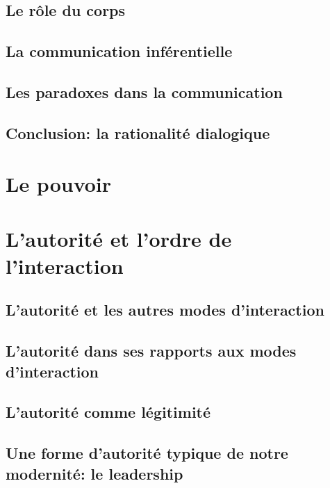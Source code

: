 \documentclass[11pt]{article} %
\begin{document}
	\subsection{Le rôle du corps}
	\subsection{La communication inférentielle}
	\subsection{Les paradoxes dans la communication}
	\subsection{Conclusion: la rationalité dialogique}
\section{Le pouvoir}
\section{L'autorité et l'ordre de l'interaction}
	\subsection{L'autorité et les autres modes d'interaction}
	\subsection{L'autorité dans ses rapports aux modes d'interaction}
	\subsection{L'autorité comme légitimité}
	\subsection{Une forme d'autorité typique de notre modernité: le leadership}
	

	
	
\end{document}

